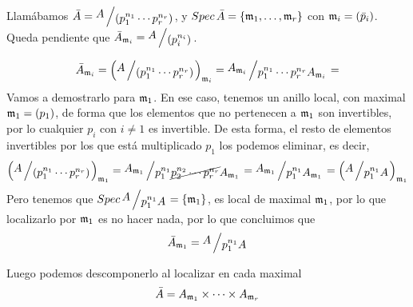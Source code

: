 \begin{lem}
Llam\'abamos $\bar A = \modulo{A}{(p_1^{n_1} \cdots p_r^{n_r})}$, y $Spec\, \bar A = \{\mathfrak{m}_1, \ldots, \mathfrak{m}_r\}$ con $\mathfrak{m}_i = (\bar p_i)$. Queda pendiente que $\bar A_{\m_i} = \modulo{A}{(p_i^{n_i})}$. 
\end{lem}
\begin{dem}
    $$\bar A_{\m_i}  = \left( \modulo{A}{(p_1^{n_1} \cdots p_r^{n_r})}\right)_{\m_i} = \modulo{A_{\m_i}}{p_1^{n_1} \cdots p_r^{n_r} A_{\m_i}}= $$
    Vamos a demostrarlo para $\mathfrak{m}_1$. En ese caso, tenemos un anillo local, con maximal $\mathfrak{m}_1= (p_1)$, de forma que los elementos que no pertenecen a $\mathfrak{m}_1$ son invertibles, por lo cualquier $p_i$ con $i\neq 1$ es invertible. De esta forma, el resto de elementos invertibles por los que est\'a multiplicado $p_1$ los podemos eliminar, es decir, 
    $$ \left( \modulo{A}{(p_1^{n_1} \cdots p_r^{n_r})}\right)_{\m_1}= \modulo{A_{\m_1}}{p_1^{n_1} \cancel{p_2^{n_2} \cdots p_r^{n_r} }A_{\m_1}} = \modulo{A_{\m_1}}{p_1^{n_1}A_{\m_1}} = \left( \modulo{A}{p_1^{n_1}  A} \right)_{\m_1}$$
    Pero tenemos que $Spec \, \modulo{A}{p_1^{n_1}  A} = \{\m_1\}$, es local de maximal $\mathfrak{m}_1$, por lo que localizarlo por $\mathfrak{m}_1$ es no hacer nada, por lo que concluimos que
    $$\bar A_{\m_1} = \modulo{A}{p_1^{n_1}  A}$$
    
\end{dem}
\begin{cor}
    Luego podemos descomponerlo al localizar en cada maximal
    $$\bar A = A_{\mathfrak{m}_1} \times \cdots \times A_{\mathfrak{m}_r} $$
\end{cor}

